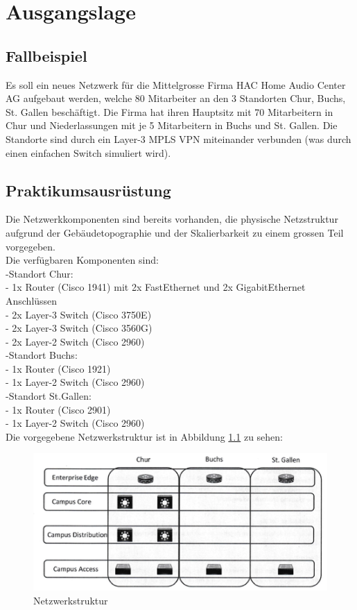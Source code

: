 \documentclass[11pt,a4paper]{scrreprt}
\begin{document}
\chapter{Ausgangslage} 
\section{Fallbeispiel}
Es soll ein neues Netzwerk für die Mittelgrosse Firma HAC Home Audio Center AG aufgebaut werden, welche 80 Mitarbeiter an den 3 Standorten Chur, Buchs, St. Gallen beschäftigt. Die Firma hat ihren Hauptsitz mit 70 Mitarbeitern in Chur und Niederlassungen mit je 5 Mitarbeitern in Buchs und St. Gallen. Die Standorte sind durch ein Layer-3 MPLS VPN miteinander verbunden (was durch einen einfachen Switch simuliert wird).
\newpage


\section{Praktikumsausrüstung} 
Die Netzwerkkomponenten sind bereits vorhanden, die physische Netzstruktur aufgrund der Gebäudetopographie und der Skalierbarkeit zu einem grossen Teil vorgegeben.\\
\newline
Die verfügbaren Komponenten sind:\\
\newline
-Standort Chur:\\
- 1x Router (Cisco 1941) mit 2x FastEthernet und 2x GigabitEthernet Anschlüssen\\
- 2x Layer-3 Switch (Cisco 3750E)\\
- 2x Layer-3 Switch (Cisco 3560G)\\
- 2x Layer-2 Switch (Cisco 2960)\\
\newline
-Standort Buchs:\\
- 1x Router (Cisco 1921)\\
- 1x Layer-2 Switch (Cisco 2960)\\
\newline
-Standort St.Gallen:\\
- 1x Router (Cisco 2901)\\
- 1x Layer-2 Switch (Cisco 2960)\\
\newline
Die vorgegebene Netzwerkstruktur ist in Abbildung \ref{abb: Netzwerksturktur} zu sehen:
\begin{figure} [H]
\centering
\includegraphics{Netzwerkstruktur.png}
\caption{Netzwerkstruktur}
\label{abb: Netzwerksturktur}
\end{figure}
\newpage
\end{document}
